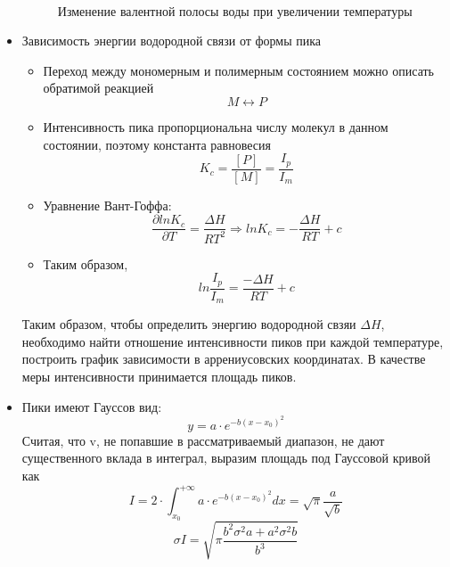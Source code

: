 \documentclass[a4paper,12pt]{article} %
\begin{document}
\begin{itemize}
\begin{figure}[h!]
 \\
\caption{\centering Изменение валентной полосы воды при увеличении температуры\label{all}
}
\end{figure} 

\item Зависимость энергии водородной связи от формы пика
\begin{itemize}
    \item Переход между мономерным и полимерным состоянием можно описать обратимой реакцией 
\begin{equation*}
    M \leftrightarrow P
\end{equation*}
\item Интенсивность пика пропорциональна числу молекул в данном состоянии, поэтому константа равновесия
\begin{equation*}
    K_c = \frac{[P]}{[M]} = \frac{I_p}{I_m}
\end{equation*}
\item Уравнение Вант-Гоффа: 
\begin{equation*}
    \frac{\partial ln K_c}{\partial T} = \frac{\Delta H}{RT^2}  \Rightarrow lnK_c = -\frac{\Delta H}{RT} + c
\end{equation*}
\item Таким образом, 
\begin{equation*}
    ln\frac{I_p}{I_m} = \frac{-\Delta H}{RT} + c
\end{equation*}\end{itemize}

Таким образом, чтобы определить энергию водородной свзяи $\Delta H$, необходимо найти отношение интенсивности пиков при каждой температуре, построить график зависимости в аррениусовских координатах. В качестве меры интенсивности принимается площадь пиков. 
\item Пики имеют Гауссов вид:
\begin{equation*}
    y = a\cdot e^{-b(x-x_0)^2}
\end{equation*}
Считая, что v, не попавшие в рассматриваемый диапазон, не дают существенного вклада в интеграл, выразим площадь под Гауссовой кривой как 
\begin{equation*}
    I = 2\cdot \int _{x_0}^{+\infty} a\cdot e^{-b(x-x_0)^2}dx = \sqrt{\pi}\frac{a}{\sqrt{b}}
\end{equation*}
\begin{equation*}
    \sigma I = \sqrt{\pi \frac{b^2 \sigma^2a + a^2 \sigma^2b}{b^3}}
\end{equation*}


\end{itemize}
\end{document}
